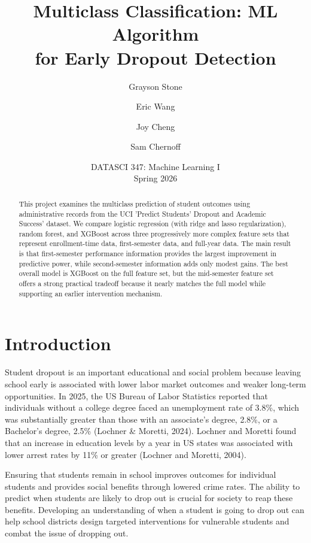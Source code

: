 \documentclass[11pt]{article}
\title{Multiclass Classification: ML Algorithm \\ for Early Dropout Detection}
\author{Grayson Stone \and Eric Wang \and Joy Cheng \and Sam Chernoff}
\date{DATASCI 347: Machine Learning I \\ Spring 2026}
\begin{document}
\maketitle

\begin{abstract}
This project examines the multiclass prediction of student outcomes using administrative records from the UCI 'Predict Students' Dropout and Academic Success' dataset. We compare logistic regression (with ridge and lasso regularization), random forest, and XGBoost across three progressively more complex feature sets that represent enrollment-time data, first-semester data, and full-year data. The main result is that first-semester performance information provides the largest improvement in predictive power, while second-semester information adds only modest gains. The best overall model is XGBoost on the full feature set, but the mid-semester feature set offers a strong practical tradeoff because it nearly matches the full model while supporting an earlier intervention mechanism.

\end{abstract}

\tableofcontents
\clearpage

\section{Introduction}

Student dropout is an important educational and social problem because leaving school early is associated with lower labor market outcomes and weaker long-term opportunities. In 2025, the US Bureau of Labor Statistics reported that individuals without a college degree faced an unemployment rate of 3.8\%, which was substantially greater than those with an associate’s degree, 2.8\%, or a Bachelor’s degree, 2.5\% (Lochner \& Moretti, 2024). Lochner and Moretti found that an increase in education levels by a year in US states was associated with lower arrest rates by 11\% or greater (Lochner and Moretti, 2004). 

Ensuring that students remain in school improves outcomes for individual students and provides social benefits through lowered crime rates. The ability to predict when students are likely to drop out is crucial for society to reap these benefits. Developing an understanding of when a student is going to drop out can help school districts design targeted interventions for vulnerable students and combat the issue of dropping out.
\end{document}
